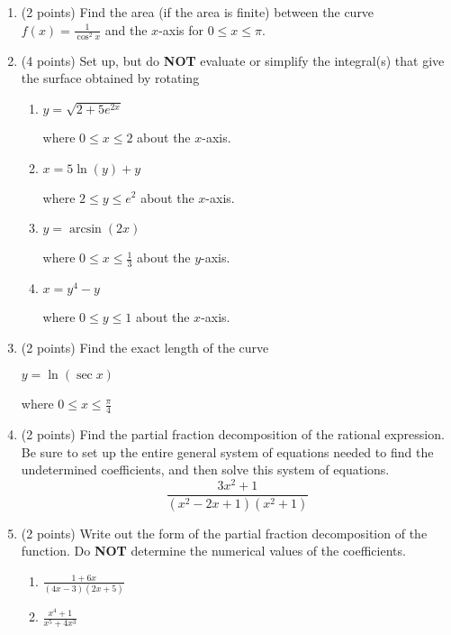 \documentclass[paper=a4, fontsize=11pt]{scrartcl} %
\numberwithin{equation}{section} %
\numberwithin{figure}{section} %
\numberwithin{table}{section} %
\begin{document}
\begin{enumerate}
\newpage
\item (2 points) Find the area (if the area is finite) between the curve $f(x)=\frac{1}{\cos^2 x}$ and the $x$-axis for $0 \le x \le \pi$.\\
\newpage
\item (4 points) Set up, but do \textbf{NOT} evaluate or simplify the integral(s) that give the surface obtained by rotating 
\begin{enumerate}
\item \begin{large}$y=\sqrt{2+5e^{2x}}$\end{large} where $0 \le x \le 2$ about the $x$-axis.
\vspace{1.75in}
\item \begin{large}$x=5 \ln(y) + y$\end{large} where $2 \le y \le e^2$ about the $x$-axis.
\vspace{1.75in}
\item \begin{large}$y=\arcsin(2x)$\end{large} where $0 \le x \le \frac{1}{3}$ about the $y$-axis.
\vspace{1.75in}
\item \begin{large}$x=y^4-y$\end{large} where $0 \le y \le 1$ about the $x$-axis.
\end{enumerate}
\newpage
\item (2 points) Find the exact length of the curve \begin{large}$y=\ln (\sec x)$\end{large} where $0 \le x \le \frac{\pi}{4}$


\newpage

\item (2 points) Find the partial fraction decomposition of the rational expression.  Be sure to set up the entire general system of equations needed to find the undetermined coefficients, and then solve this system of equations.\\
\begin{equation*}
\frac{3x^2+1}{(x^2-2x+1)(x^2+1)}
\end{equation*}

\newpage

\item (2 points) Write out the form of the partial fraction decomposition of the function.  Do \textbf{NOT} determine the numerical values of the coefficients. 
\begin{enumerate}
\item \begin{large}$\frac{1+6x}{(4x-3)(2x+5)}$\end{large}
\vspace{1.5in}
\item \begin{large}$\frac{x^4+1}{x^5+4x^3}$\end{large}
\end{enumerate}


\end{enumerate}
\end{document}
